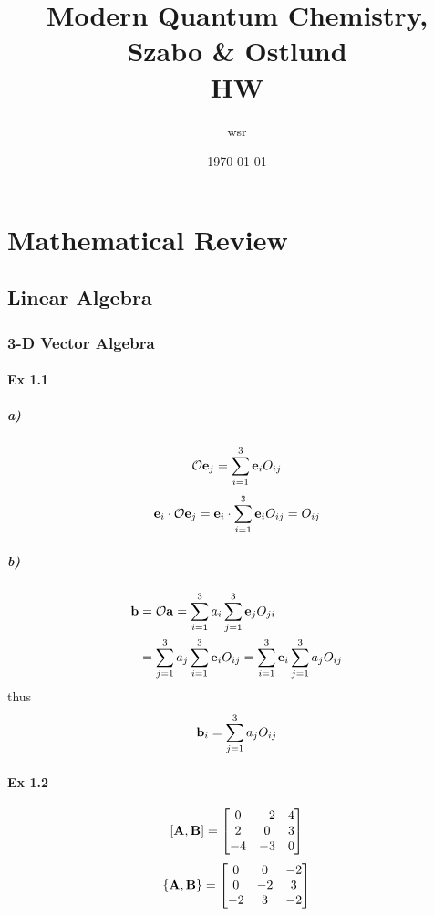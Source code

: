 \documentclass[a4paper]{article}
\title{\textbf{Modern Quantum Chemistry, Szabo \& Ostlund}\\HW}
\author{wsr
\vspace{5pt}\\
}
\date{\today} %
\newcommand{\ex}[1]{\paragraph{Ex #1}}
\newcommand{\subex}[1]{\subparagraph{#1}}
\numberwithin{equation}{subsection}
\begin{document}

\maketitle

\tableofcontents

\newpage

\section{Mathematical Review}
\subsection{Linear Algebra}
\subsubsection{3-D Vector Algebra}
\ex{1.1}
\subex{a)}
\begin{equation}\label{key}
\mathcal{O}\vb{e}_j = \sum_{i=1}^3 \vb{e}_i O_{ij}
\end{equation}
\begin{equation}\label{key}
\vb{e}_i \cdot \mathcal{O}\vb{e}_j = \vb{e}_i \cdot \sum_{i=1}^3 \vb{e}_i O_{ij} = O_{ij}
\end{equation}
\subex{b)}
\begin{equation}\label{key}
\begin{aligned}
\vb{b} &= \mathcal{O}\vb{a} = \sum_{i=1}^3 a_i\sum_{j=1}^3 \vb{e}_jO_{ji}\\
&=\sum_{j=1}^3 a_j\sum_{i=1}^3 \vb{e}_iO_{ij} = \sum_{i=1}^3 \vb{e}_i\sum_{j=1}^3 a_jO_{ij}
\end{aligned}
\end{equation}
thus
\begin{equation}\label{key}
\vb{b}_i = \sum_{j=1}^3 a_jO_{ij}
\end{equation}

\ex{1.2} 
\begin{equation}\label{key}
[\vb{A},\vb{B}] = \mqty[0& -2& 4\\2& 0& 3\\-4& -3& 0]
\end{equation}
\begin{equation}\label{key}
\{\vb{A},\vb{B}\} = \mqty[0& 0& -2\\0& -2& 3\\-2& 3& -2]
\end{equation}
\end{document}
